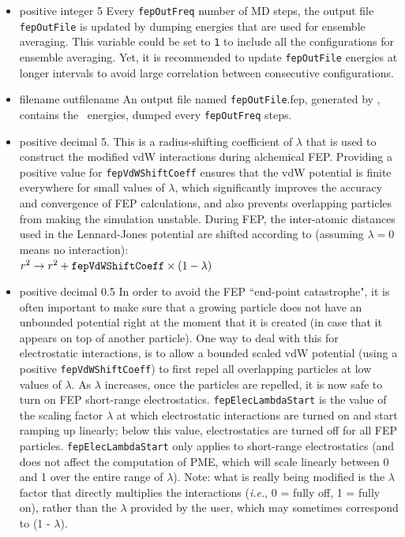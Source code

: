 \begin{itemize}
\item
{}
{positive integer}
{5}
{Every {\tt fepOutFreq} number of MD steps, the output file
{\tt fepOutFile} is updated by dumping energies that are
used for ensemble averaging.
This variable could be set to {\tt 1} to include all the 
configurations for ensemble averaging. Yet, it is recommended
to update {\tt fepOutFile}  energies at longer intervals
to avoid large correlation between consecutive configurations.}

\item
{}
{filename}
{outfilename}
{An output file named {\tt fepOutFile}.fep, generated by \NAMD,
contains the \FEP\ energies, dumped every {\tt fepOutFreq} steps.}

\item
{}
{positive decimal}
{5.}
{This is a radius-shifting coefficient of $\lambda$ that is used 
to construct the modified vdW interactions during alchemical FEP. Providing a positive value for {\tt fepVdWShiftCoeff} ensures that the vdW potential is finite everywhere for small values of $\lambda$, which significantly improves the accuracy and convergence of FEP calculations, and also prevents overlapping particles from making the simulation unstable. During FEP, the inter-atomic distances used in the Lennard-Jones potential are shifted
according to (assuming $\lambda = 0$ means no interaction): \\
$r^2 \rightarrow r^2 + {\tt fepVdWShiftCoeff} \times (1 - \lambda)$
}

\item
{}
{positive decimal}
{0.5}
{In order to avoid the FEP ``end-point catastrophe", it is often important to make sure that a growing particle does not have an unbounded potential right at the moment that it is created (in case that it appears on top of another particle). One way to deal with this for electrostatic interactions, is to allow a bounded scaled vdW potential (using a positive {\tt fepVdWShiftCoeff}) to first repel all overlapping particles at low values of $\lambda$. As $\lambda$ increases, once the particles are repelled, it is now safe to turn on FEP short-range electrostatics. {\tt fepElecLambdaStart} is the value of the scaling factor $\lambda$ at which electrostatic interactions are turned on and start ramping up linearly; below this value, electrostatics are turned off for all FEP particles. {\tt fepElecLambdaStart} only applies to short-range electrostatics (and does not affect the computation of PME, which will scale linearly between 0 and 1 over the entire range of $\lambda$). Note: what is really being modified is the $\lambda$ factor that directly multiplies the interactions (\emph{i.e.}, 0 = fully off, 1 = fully on), rather than the $\lambda$ provided by the user, which may sometimes correspond to (1 - $\lambda$).}



\end{itemize}
